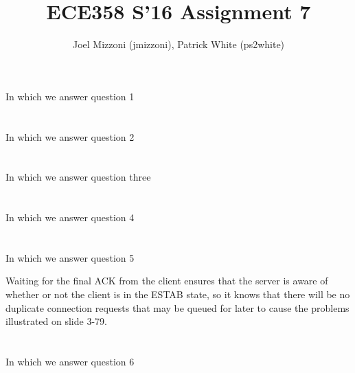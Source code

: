 \documentclass[10pt,a4paper]{article}
\author{Joel Mizzoni (jmizzoni), Patrick White (ps2white)}
\begin{document}
\title{ECE358 S'16 Assignment 7}
\maketitle
\section{}
In which we answer question 1
\section{}
In which we answer question 2
\section{}
In which we answer question three
\section{}
In which we answer question 4
\section{}
In which we answer question 5

Waiting for the final ACK from the client ensures that the server is aware of whether or not the client is in the ESTAB state, so it knows that there will be no duplicate connection requests that may be queued for later to cause the problems illustrated on slide 3-79.

\section{}
In which we answer question 6
\end{document}

